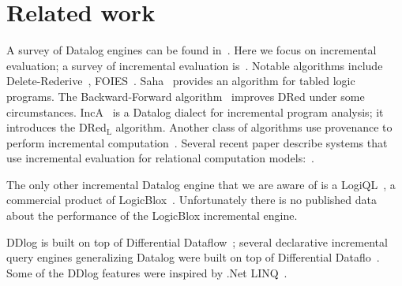 \section{Related work}

A survey of Datalog engines can be found in~\cite{Maier-book18}.  Here
we focus on incremental evaluation; a survey of incremental evaluation
is~\cite{gupta-deb95}.  Notable algorithms include
Delete-Rederive~\cite{Gupta-sigmod93}, FOIES~\cite{dong-dbpl94}.
Saha~\cite{saha-iclp03} provides an algorithm for tabled logic
programs.  The Backward-Forward algorithm~\cite{motik-aaai15} improves
DRed under some circumstances.  IncA~\cite{IncA,Szabo-ase016} is a
Datalog dialect for incremental program analysis; it introduces the
DRed$_{\mbox{L}}$ algorithm.  Another class of algorithms use
provenance to perform incremental computation~\cite{liu-icde09}.
Several recent paper describe systems that use incremental evaluation
for relational computation models:~\cite{ahmad-vldb12,zhao-icmd17}.

The only other incremental Datalog engine that we are aware
of is a LogiQL~\cite{Green-pods15}, a commercial product of
LogicBlox~\cite{Aref-sigmod15}.  Unfortunately there is no published
data about the performance of the LogicBlox incremental engine.

DDlog is built on top of Differential
Dataflow~\cite{differential-dataflow}; several declarative incremental
query engines generalizing Datalog were built on top of
Differential Dataflo~\cite{timely-dataflow,differential-dataflow-paper}.  Some of the
DDlog features were inspired by .Net LINQ~\cite{meijer-dpcool03}.
